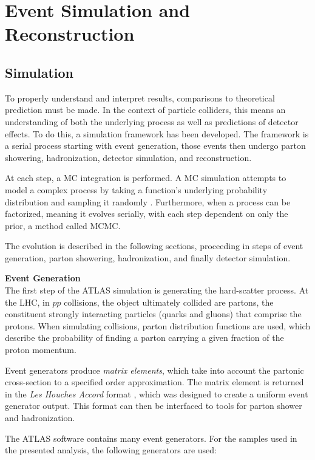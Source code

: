 \chapter{Event Simulation and Reconstruction}

\section{Simulation} \label{sec:simulation}

To properly understand and interpret results, comparisons to theoretical prediction must be made. In the context of particle colliders, this means an understanding of both the underlying process as well as predictions of detector effects. To do this, a simulation framework has been developed. The framework is a serial process starting with event generation, those events then undergo parton showering, hadronization, detector simulation, and reconstruction.

At each step, a \gls{MC} integration is performed. A \gls{MC} simulation attempts to model a complex process by taking a function's underlying probability distribution and sampling it randomly {\color{red}}. Furthermore, when a process can be factorized, meaning it evolves serially, with each step dependent on only the prior, a method called \gls{MCMC}.

The evolution is described in the following sections, proceeding in steps of event generation, parton showering, hadronization, and finally detector simulation.

\noindent\textbf{Event Generation}\\
\indent The first step of the ATLAS simulation is generating the hard-scatter process. At the \gls{LHC}, in $pp$ collisions, the object ultimately collided are partons, the constituent strongly interacting particles (quarks and gluons) that comprise the protons. When simulating collisions, parton distribution functions are used, which describe the probability of finding a parton carrying a given fraction of the proton momentum.


Event generators produce \textit{matrix elements}, which take into account the partonic cross-section to a specified order approximation. The matrix element is returned in the \textit{Les Houches Accord} format \cite{les-houches}, which was designed to create a uniform event generator output. This format can then be interfaced to tools for parton shower and hadronization.

The ATLAS software contains many event generators. For the samples used in the presented analysis, the following generators are used:

